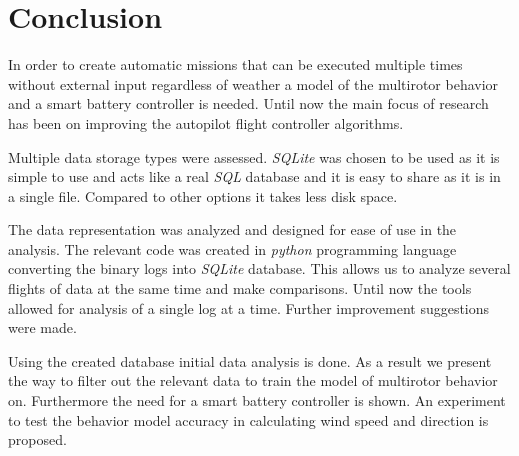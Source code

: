 \documentclass[12pt,oneside]{reedthesis}
\theoremstyle{definition}
\theoremstyle{definition}
\theoremstyle{definition}
\theoremstyle{remark}
\begin{document}
\chapter*{Conclusion}\label{conclusion}

In order to create automatic missions that can be executed multiple
times without external input regardless of weather a model of the
multirotor behavior and a smart battery controller is needed. Until now
the main focus of research has been on improving the autopilot flight
controller algorithms.

Multiple data storage types were assessed. \emph{SQLite} was chosen to
be used as it is simple to use and acts like a real \emph{SQL} database
and it is easy to share as it is in a single file. Compared to other
options it takes less disk space.

The data representation was analyzed and designed for ease of use in the
analysis. The relevant code was created in \emph{python} programming
language converting the binary logs into \emph{SQLite} database. This
allows us to analyze several flights of data at the same time and make
comparisons. Until now the tools allowed for analysis of a single log at
a time. Further improvement suggestions were made.

Using the created database initial data analysis is done. As a result we
present the way to filter out the relevant data to train the model of
multirotor behavior on. Furthermore the need for a smart battery
controller is shown. An experiment to test the behavior model accuracy
in calculating wind speed and direction is proposed.

\appendix
\end{document}
